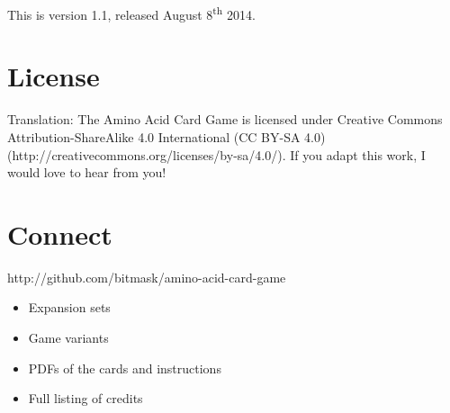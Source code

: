 \documentclass[a4paper,11pt,oneside]{memoir}
\begin{document}
This is version 1.1, released August 8\textsuperscript{th} 2014.  


\section*{License}

Translation: The Amino Acid Card Game is licensed under \cc Creative Commons Attribution-ShareAlike 4.0 International (CC BY-SA 4.0)
(http://creativecommons.org/licenses/by-sa/4.0/).
If you adapt this work, I would love to hear from you!


\section*{Connect}

http://github.com/bitmask/amino-acid-card-game

\begin{itemize}
    \item Expansion sets
    \item Game variants
    \item PDFs of the cards and instructions
    \item Full listing of credits
\end{itemize}
\end{document}
